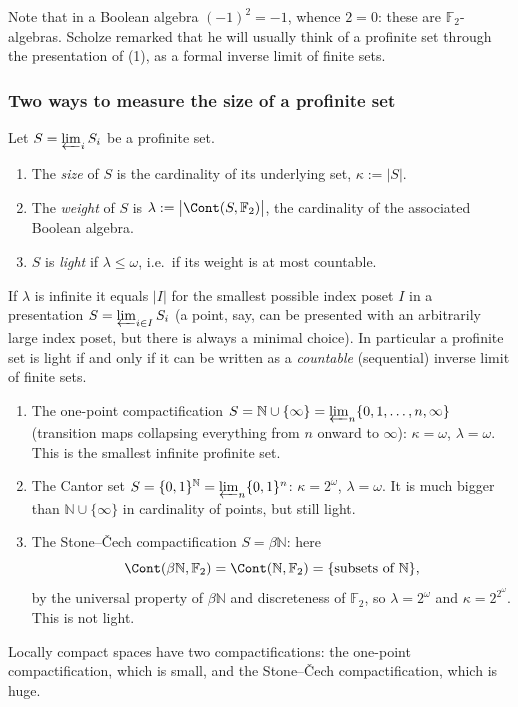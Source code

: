 Note that in a Boolean algebra $(-1)^2=-1$, whence $2=0$: these are
$\mathbb{F}_2$-algebras. Scholze remarked that he will usually think of a
profinite set through the presentation of (1), as a
formal inverse limit of finite sets.

\subsubsection*{Two ways to measure the size of a profinite set}

\begin{definition}
\label{def:2:size-weight}
Let $S=\varprojlim_i S_i$ be a profinite set.
\begin{enumerate}
\item The \emph{size} of $S$ is the cardinality of its underlying set,
$\kappa:=|S|$.
\item The \emph{weight} of $S$ is $\lambda:=\bigl|\Cont(S,\mathbb{F}_2)\bigr|$,
the cardinality of the associated Boolean algebra.
\item $S$ is \emph{light} if $\lambda\le\omega$, i.e.\ if its weight is at most
countable.
\end{enumerate}
\end{definition}

\begin{remark}
\label{rmk:2:weight-index}
If $\lambda$ is infinite it equals $|I|$ for the smallest possible index poset
$I$ in a presentation $S=\varprojlim_{i\in I}S_i$ (a point, say, can be presented
with an arbitrarily large index poset, but there is always a minimal choice). In
particular a profinite set is light if and only if it can be written as a
\emph{countable} (sequential) inverse limit of finite sets.
\end{remark}

\begin{example}
\label{ex:2:size-weight}
\begin{enumerate}
\item The one-point compactification $S=\mathbb{N}\cup\{\infty\}=\varprojlim_n
\{0,1,\dots,n,\infty\}$ (transition maps collapsing everything from $n$ onward to
$\infty$): $\kappa=\omega$, $\lambda=\omega$. This is the smallest infinite
profinite set.
\item The Cantor set $S=\{0,1\}^{\mathbb{N}}=\varprojlim_n\{0,1\}^n$:
$\kappa=2^{\omega}$, $\lambda=\omega$. It is much bigger than
$\mathbb{N}\cup\{\infty\}$ in cardinality of points, but still light.
\item The Stone--\v{C}ech compactification $S=\beta\mathbb{N}$: here
\[
\Cont(\beta\mathbb{N},\mathbb{F}_2)=\Cont(\mathbb{N},\mathbb{F}_2)
=\{\text{subsets of }\mathbb{N}\},
\]
by the universal property of $\beta\mathbb{N}$ and discreteness of $\mathbb{F}_2$,
so $\lambda=2^{\omega}$ and $\kappa=2^{2^{\omega}}$. This is not light.
\end{enumerate}
Locally compact spaces have two compactifications: the one-point compactification,
which is small, and the Stone--\v{C}ech compactification, which is huge.
\end{example}

